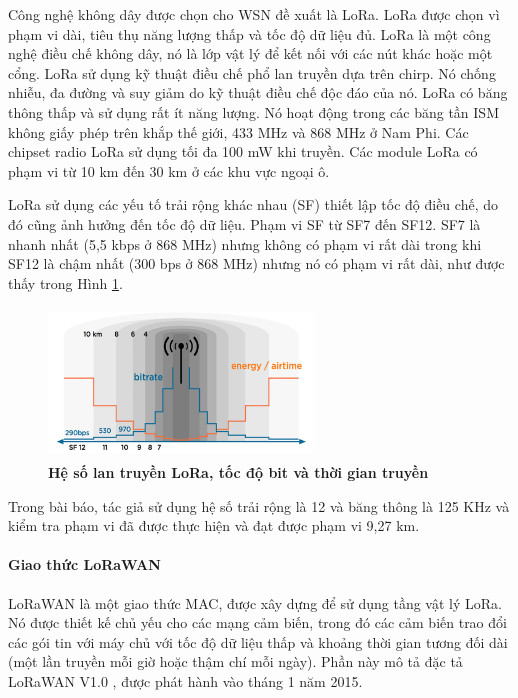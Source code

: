 \documentclass{article} %
\begin{document}
	Công nghệ không dây được chọn cho WSN đề xuất là LoRa. LoRa được chọn vì phạm vi dài, tiêu thụ năng lượng thấp và tốc độ dữ liệu đủ. LoRa là một công nghệ điều chế không dây, nó là lớp vật lý để kết nối với các nút khác hoặc một cổng. LoRa sử dụng kỹ thuật điều chế phổ lan truyền dựa trên chirp. Nó chống nhiễu, đa đường và suy giảm do kỹ thuật điều chế độc đáo của nó. LoRa có băng thông thấp và sử dụng rất ít năng lượng. Nó hoạt động trong các băng tần ISM không giấy phép trên khắp thế giới, 433 MHz và 868 MHz ở Nam Phi. Các chipset radio LoRa sử dụng tối đa 100 mW khi truyền. Các module LoRa có phạm vi từ 10 km đến 30 km ở các khu vực ngoại ô.
	
	LoRa sử dụng các yếu tố trải rộng khác nhau (SF) thiết lập tốc độ điều chế, do đó cũng ảnh hưởng đến tốc độ dữ liệu. Phạm vi SF từ SF7 đến SF12. SF7 là nhanh nhất (5,5 kbps ở 868 MHz) nhưng không có phạm vi rất dài trong khi SF12 là chậm nhất (300 bps ở 868 MHz) nhưng nó có phạm vi rất dài, như được thấy trong Hình \ref{SFlora}.
	
	\begin{figure}[!ht]
		\centering
		\includegraphics[width=7cm,height=4cm]{Images/SFlora.png}
		\caption[Hệ số lan truyền LoRa, tốc độ bit và thời gian truyền\cite{LoRaAlliance}]{\bfseries \fontsize{12pt}{0pt}\selectfont Hệ số lan truyền LoRa, tốc độ bit và thời gian truyền \cite{LoRaAlliance}}
		\label{SFlora}
	\end{figure}
	
	Trong bài báo, tác giả\cite{shuda2018towards} sử dụng hệ số trải rộng là 12 và băng thông là 125 KHz và kiểm tra phạm vi đã được thực hiện và đạt được phạm vi 9,27 km.
	
	
	\newpage
	\paragraph{Giao thức LoRaWAN}\mbox{}
	
	LoRaWAN là một giao thức MAC, được xây dựng để sử dụng tầng vật lý LoRa. Nó được thiết kế chủ yếu cho các mạng cảm biến, trong đó các cảm biến trao đổi các gói tin với máy chủ với tốc độ dữ liệu thấp và khoảng thời gian tương đối dài (một lần truyền mỗi giờ hoặc thậm chí mỗi ngày). Phần này mô tả đặc tả LoRaWAN V1.0 \cite{LoRaAlliance}, được phát hành vào tháng 1 năm 2015.
	
\end{document}

